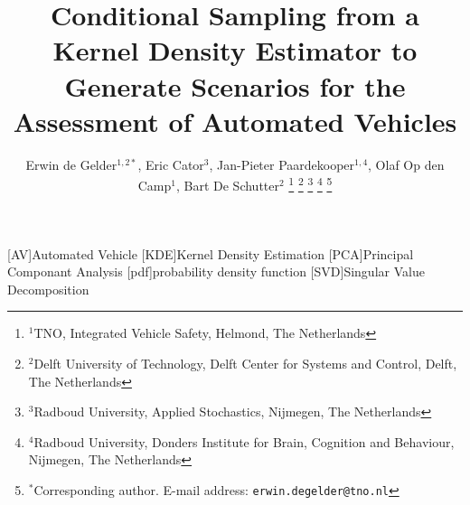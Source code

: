 \documentclass[conference, a4paper]{ieeeconf}
\title{Conditional Sampling from a Kernel Density Estimator to Generate Scenarios for the Assessment of Automated Vehicles}
\author{Erwin de Gelder$^{1,2*}$, Eric Cator$^{3}$, Jan-Pieter Paardekooper$^{1,4}$, Olaf Op den Camp$^{1}$, Bart De Schutter$^{2}$%
\thanks{$^{1}$TNO, Integrated Vehicle Safety, Helmond, The Netherlands}%
\thanks{$^{2}$Delft University of Technology, Delft Center for Systems and Control, Delft, The Netherlands}%
\thanks{$^{3}$Radboud University, Applied Stochastics, Nijmegen, The Netherlands}%
\thanks{$^{4}$Radboud University, Donders Institute for Brain, Cognition and Behaviour, Nijmegen, The Netherlands}%
\thanks{$^{*}$Corresponding author. \newline E-mail address: {\tt\small erwin.degelder@tno.nl}}}%
\date{}
\begin{document}
\begin{acronym}[AAAAAAAA]
	[AV]{Automated Vehicle}
	[KDE]{Kernel Density Estimation}
	[PCA]{Principal Componant Analysis}
	[pdf]{probability density function}
	[SVD]{Singular Value Decomposition}
\end{acronym}

\maketitle


\acresetall





\acresetall





\printbibliography
\end{document}

